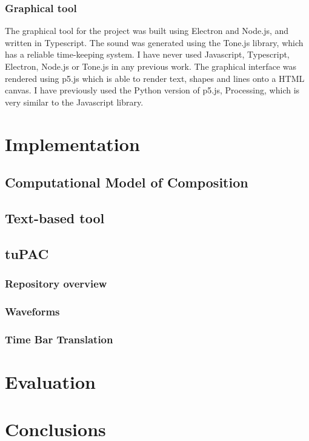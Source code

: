 \documentclass[12pt,a4paper,twoside,openright]{report}
\begin{document}
\subsection{Graphical tool}
The graphical tool for the project was built using Electron and Node.js, and written in Typescript. The sound was generated using the Tone.js library, which has a reliable time-keeping system. I have never used Javascript, Typescript, Electron, Node.js or Tone.js in any previous work. The graphical interface was rendered using p5.js which is able to render text, shapes and lines onto a HTML canvas. I have previously used the Python version of p5.js, Processing, which is very similar to the Javascript library.


\chapter{Implementation}
\section{Computational Model of Composition}

\section{Text-based tool}

\section{tuPAC}
\subsection{Repository overview}



\subsection{Waveforms}

\subsection{Time Bar Translation}

\chapter{Evaluation}



\chapter{Conclusions}
\end{document}
